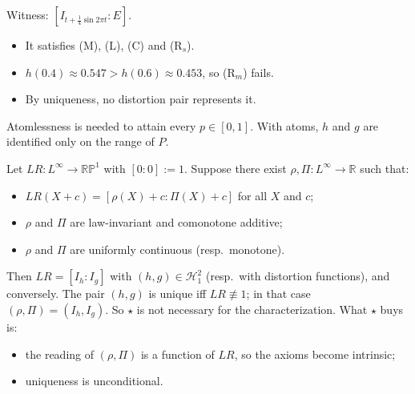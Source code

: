 \begin{example}[(R$_m$) in Theorem B]
Witness: $[I_{t+\frac14\sin2\pi t}:E]$.
\begin{itemize}
\item It satisfies (M), (L), (C) and (R$_s$).
\item $h(0.4)\approx0.547>h(0.6)\approx0.453$, so (R$_m$) fails.
\item By uniqueness, no distortion pair represents it.
\end{itemize}
\end{example}

\begin{remark}[Atomlessness]
Atomlessness is needed to attain every $p\in[0,1]$. With atoms, $h$ and $g$ are identified only on the range of $P$.
\end{remark}

\begin{proposition}
Let $LR:L^\infty\to\mathbb{RP}^1$ with $[0:0]:=1$. Suppose there exist $\rho,\Pi:L^\infty\to\mathbb R$ such that:
\begin{itemize}
\item $LR(X+c)=[\rho(X)+c:\Pi(X)+c]$ for all $X$ and $c$;
\item $\rho$ and $\Pi$ are law-invariant and comonotone additive;
\item $\rho$ and $\Pi$ are uniformly continuous (resp.\ monotone).
\end{itemize}
Then $LR=[I_h:I_g]$ with $(h,g)\in\mathcal H_1^2$ (resp.\ with distortion functions), and conversely. The pair $(h,g)$ is unique iff $LR\not\equiv1$; in that case $(\rho,\Pi)=(I_h,I_g)$. So $\star$ is not necessary for the characterization. What $\star$ buys is:
\begin{itemize}
\item the reading of $(\rho,\Pi)$ is a function of $LR$, so the axioms become intrinsic;
\item uniqueness is unconditional.
\end{itemize}
\end{proposition}

